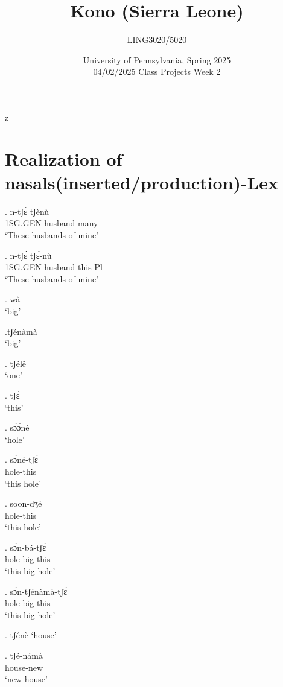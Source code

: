 z   \documentclass{assets/fieldnotes}
\title{Kono (Sierra Leone)}
\author{LING3020/5020}
\date{University of Pennsylvania, Spring 2025\\04/02/2025 Class Projects Week 2}
\begin{document}
\maketitle

\maketitle
\tableofcontents

\section{Realization of nasals(inserted/production)-Lex}


     
   
\exg.  n-tʃɛ́ tʃènù\\
1SG.GEN-husband many \\
`These husbands of mine'


\exg.  n-tʃɛ́ tʃɛ́-nù\\
1SG.GEN-husband this-Pl \\
`These husbands of mine'

\ex. wà\\
`big'

\ex.tʃénàmà\\
`big'

\ex. tʃélê\\
`one'

\ex.  tʃɛ̀\\
`this'

\ex. sɔ̀ɔ̀né\\
`hole'

\exg. sɔ̀né-tʃɛ̀ \\
hole-this\\
`this hole' 

\exg. soon-dʒé\\
hole-this\\
`this hole' 


\exg. sɔ̀n-bá-tʃɛ̀\\
hole-big-this\\
`this big hole'

\exg. sɔ̀n-tʃénàmà-tʃɛ̀\\
hole-big-this\\
`this big hole'


\ex. tʃénè
`house'

\exg. tʃé-námà\\
house-new\\
`new house'
\end{document}
